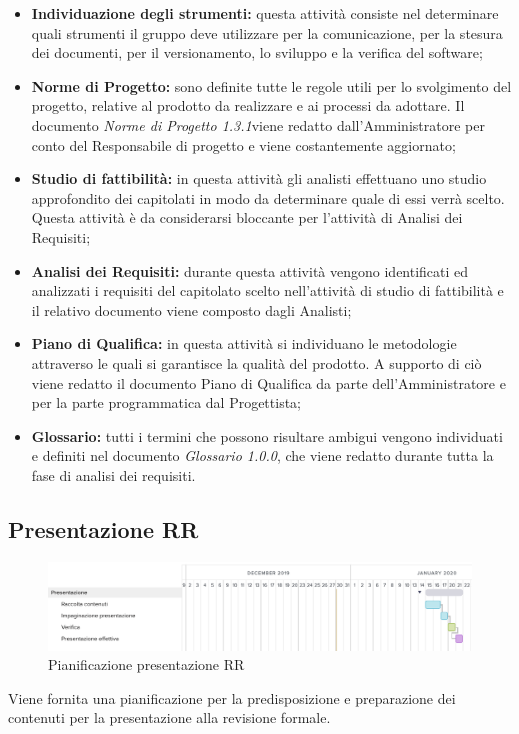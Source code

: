 \begin{itemize}
	\item \textbf{Individuazione degli strumenti:} questa attività consiste nel determinare quali strumenti il gruppo deve utilizzare per la comunicazione, per la stesura dei documenti, per il versionamento, lo sviluppo e la verifica del software;
	\item \textbf{Norme di Progetto:} sono definite tutte le regole utili per lo svolgimento del progetto, relative al prodotto da realizzare e ai processi da adottare. Il documento \textit{Norme di Progetto 1.3.1}\doc viene redatto dall'Amministratore per conto del Responsabile di progetto e viene costantemente aggiornato;
	\item \textbf{Studio di fattibilità:} in questa attività gli analisti effettuano uno studio approfondito dei capitolati in modo da determinare quale di essi verrà scelto. Questa attività è da considerarsi bloccante per l’attività di Analisi dei Requisiti;
	\item \textbf{Analisi dei Requisiti:} durante questa attività vengono identificati ed analizzati i requisiti del capitolato scelto nell'attività di studio di fattibilità e il relativo documento viene composto dagli Analisti;
	\item \textbf{Piano di Qualifica:} in questa attività si individuano le metodologie attraverso le quali si garantisce la qualità del prodotto. A supporto di ciò viene redatto il documento Piano di Qualifica da parte dell'Amministratore e per la parte programmatica dal Progettista;
	\item \textbf{Glossario:} tutti i termini che possono risultare ambigui vengono individuati e definiti nel documento \textit{Glossario 1.0.0}\docs, che viene redatto durante tutta la fase di analisi dei requisiti.
\end{itemize}

\newpage
\subsection{Presentazione RR}
\begin{figure}[h!]
	\includegraphics[width=\textwidth]{res/img/g2}
	\caption{Pianificazione presentazione RR}
\end{figure}
Viene fornita una pianificazione per la predisposizione e preparazione dei contenuti per la presentazione alla revisione formale.

